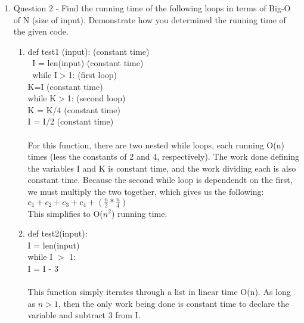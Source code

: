 \documentclass{article}
\begin{document}
\begin{enumerate}
\begin{enumerate}
  \end{enumerate}
\item Question 2 - Find the running time of the following loops in terms of Big-O of N (size of input). 
  Demonstrate how you determined the running time of the given code.\\
    \begin{enumerate} 
      \item def test1 (input): (constant time)\\
        $\>$ I = len(input) (constant time)\\
        $\>$ while I$>$1: (first loop)\\
         K=I (constant time)\\
        \indent \indent while K$>$1: (second loop)\\
        \indent \indent \indent K = K/4 (constant time)\\
        \indent \indent I = I/2 (constant time)\\\\
        For this function, there are two nested while loops, each running O(n) times (less the constants of 2 and 
        4, respectively). The work done defining the variables I and K is constant time,
        and the work dividing each is also constant time. Because the second while loop is dependendt on the first,
        we must multiply the two together, which gives us the following:\\
        \(c_{1}+c_{2}+c_{3}+c_{4} + (\frac n 2 *\frac n 4 )\)\\
        This simplifies to O($n^2$) running time.\\

        \item def test2(input):\\
        \indent I = len(input)\\
        \indent while I $>$ 1:\\
        \indent \indent I = I - 3\\\\
        This function simply iterates through a list in linear time O(n). As long as $n>1$, then the only work
        being done is constant time to declare the variable and subtract 3 from I. \\


\end{enumerate}
\end{enumerate}
\end{document}
